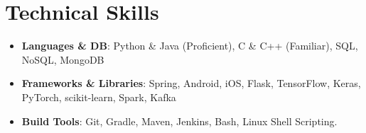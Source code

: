 \documentclass[letterpaper,10pt]{article}
\newcommand{\resumeSubHeadingListStart}{\begin{itemize}[leftmargin=\hoffset]}
\newcommand{\resumeSubHeadingListEnd}{\end{itemize}}
\begin{document}
	\section{\faBolt \space Technical Skills}
	\resumeSubHeadingListStart
	\item{
		\textbf{Languages \& DB}{: Python \& Java (Proficient), C \& C++ (Familiar), SQL, NoSQL, MongoDB}}
	\vspace{-4pt}
	\item{
		\textbf{Frameworks \& Libraries}{: Spring, Android, iOS, Flask, TensorFlow, Keras, PyTorch, scikit-learn, Spark, Kafka}}
	\vspace{-4pt}
	\item{
		\textbf{Build Tools}{: Git, Gradle, Maven, Jenkins, Bash, Linux Shell Scripting.}}
	\resumeSubHeadingListEnd
	
	
	
\end{document}

